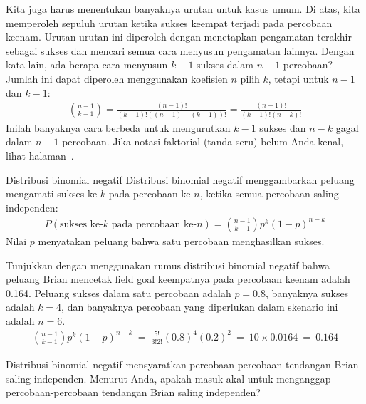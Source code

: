 \D{\newpage}

Kita juga harus menentukan banyaknya urutan untuk kasus umum. Di atas, kita memperoleh sepuluh urutan ketika sukses keempat terjadi pada percobaan keenam. Urutan-urutan ini diperoleh dengan menetapkan pengamatan terakhir sebagai sukses dan mencari semua cara menyusun pengamatan lainnya. Dengan kata lain, ada berapa cara menyusun $k-1$ sukses dalam $n-1$ percobaan? Jumlah ini dapat diperoleh menggunakan koefisien $n$ pilih $k$, tetapi untuk $n-1$ dan $k-1$:
\begin{align*}
{n-1 \choose k-1} = \frac{(n-1)!}{(k-1)! \left((n-1) - (k-1)\right)!} = \frac{(n-1)!}{(k-1)! \left(n - k\right)!}
\end{align*}
Inilah banyaknya cara berbeda untuk mengurutkan $k-1$ sukses dan $n-k$ gagal dalam $n-1$ percobaan. Jika notasi faktorial (tanda seru) belum Anda kenal, lihat halaman~\pageref{factorial_defined}.

\begin{onebox}{Distribusi binomial negatif}
  Distribusi binomial negatif menggambarkan
  peluang mengamati sukses ke-$k$ pada
  percobaan ke-$n$, ketika semua percobaan saling independen:
  \begin{align*}
  P(\text{sukses ke-$k$ pada percobaan ke-$n$})
      = {n-1 \choose k-1} p^{k}(1-p)^{n-k}
  \end{align*}
  Nilai $p$ menyatakan peluang bahwa
  satu percobaan menghasilkan sukses.
\end{onebox}

\begin{examplewrap}
\begin{nexample}{Tunjukkan dengan menggunakan rumus distribusi binomial negatif bahwa peluang Brian mencetak field goal keempatnya pada percobaan keenam adalah 0.164.}
Peluang sukses dalam satu percobaan adalah $p=0.8$, banyaknya sukses adalah $k=4$, dan banyaknya percobaan yang diperlukan dalam skenario ini adalah $n=6$.
\begin{align*}
{n-1 \choose k-1}p^k(1-p)^{n-k}\ 
	=\ \frac{5!}{3!2!} (0.8)^4 (0.2)^2\ 
	=\ 10\times 0.0164\ 
	=\ 0.164
\end{align*}
\end{nexample}
\end{examplewrap}

\begin{exercisewrap}
\begin{nexercise}
Distribusi binomial negatif mensyaratkan percobaan-percobaan tendangan Brian saling independen. Menurut Anda, apakah masuk akal untuk menganggap percobaan-percobaan tendangan Brian saling independen?\footnotemark
\end{nexercise}
\end{exercisewrap}

